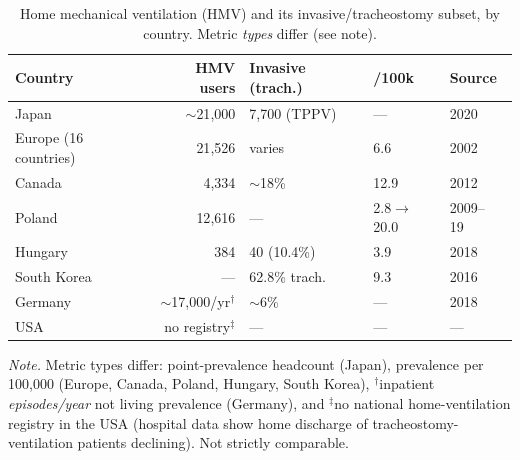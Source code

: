 \begin{table}[tbp]
\caption{Home mechanical ventilation (HMV) and its invasive/tracheostomy subset, by
country. Metric \emph{types} differ (see note).}
\label{tab:hmv}
\small
\setlength{\tabcolsep}{4pt}
\begin{tabular}{@{}lrll l@{}}
\toprule
Country & HMV users & Invasive (trach.) & /100k & Source \\
\midrule
Japan & $\sim$21{,}000 & 7{,}700 (TPPV) & --- & 2020~\cite{hmv_japan2020} \\
Europe (16 countries) & 21{,}526 & varies & 6.6 & 2002~\cite{eurovent2005} \\
Canada & 4{,}334 & $\sim$18\% & 12.9 & 2012~\cite{hmv_canada2015} \\
Poland & 12{,}616 & --- & 2.8$\to$20.0 & 2009--19~\cite{hmv_poland2022} \\
Hungary & 384 & 40 (10.4\%) & 3.9 & 2018~\cite{hmv_hungary2018} \\
South Korea & --- & 62.8\% trach. & 9.3 & 2016~\cite{hmv_korea2019} \\
Germany & $\sim$17{,}000/yr$^{\dagger}$ & $\sim$6\% & --- & 2018~\cite{hmv_germany2021} \\
USA & no registry$^{\ddagger}$ & --- & --- & ---~\cite{us_trach_mehta2015} \\
\bottomrule
\end{tabular}

\smallskip
{\footnotesize \emph{Note.} Metric types differ: point-prevalence headcount (Japan),
prevalence per 100{,}000 (Europe, Canada, Poland, Hungary, South Korea),
$^{\dagger}$inpatient \emph{episodes/year} not living prevalence (Germany), and
$^{\ddagger}$no national home-ventilation registry in the USA (hospital data show home
discharge of tracheostomy-ventilation patients declining). Not strictly comparable.}
\end{table}

